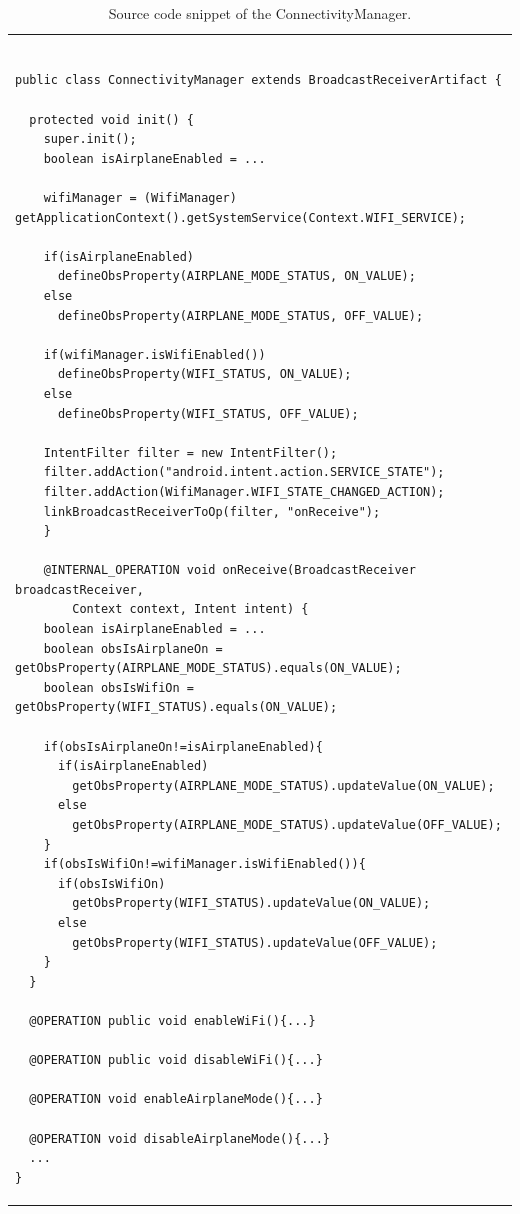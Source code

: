 \documentclass[11pt]{report}
\newcommand\labeltab[1]{\label{tb:#1}}
\begin{document}
\begin{table}[!htp]
\begin{tabular} {p{10cm}}
\begin{minipage}{10cm}
{\scriptsize \begin{verbatim}

public class ConnectivityManager extends BroadcastReceiverArtifact {
	
  protected void init() {
    super.init();
    boolean isAirplaneEnabled = ...

    wifiManager = (WifiManager) getApplicationContext().getSystemService(Context.WIFI_SERVICE);
		
    if(isAirplaneEnabled)
      defineObsProperty(AIRPLANE_MODE_STATUS, ON_VALUE);
    else
      defineObsProperty(AIRPLANE_MODE_STATUS, OFF_VALUE);
		
    if(wifiManager.isWifiEnabled())
      defineObsProperty(WIFI_STATUS, ON_VALUE);
    else
      defineObsProperty(WIFI_STATUS, OFF_VALUE);
		
    IntentFilter filter = new IntentFilter();
    filter.addAction("android.intent.action.SERVICE_STATE");
    filter.addAction(WifiManager.WIFI_STATE_CHANGED_ACTION);
    linkBroadcastReceiverToOp(filter, "onReceive");
	}
	
	@INTERNAL_OPERATION void onReceive(BroadcastReceiver broadcastReceiver, 
	    Context context, Intent intent) {
    boolean isAirplaneEnabled = ...
    boolean obsIsAirplaneOn = getObsProperty(AIRPLANE_MODE_STATUS).equals(ON_VALUE);
    boolean obsIsWifiOn = getObsProperty(WIFI_STATUS).equals(ON_VALUE);
		
    if(obsIsAirplaneOn!=isAirplaneEnabled){
      if(isAirplaneEnabled)
        getObsProperty(AIRPLANE_MODE_STATUS).updateValue(ON_VALUE);
      else
        getObsProperty(AIRPLANE_MODE_STATUS).updateValue(OFF_VALUE);
    }
    if(obsIsWifiOn!=wifiManager.isWifiEnabled()){
      if(obsIsWifiOn)
        getObsProperty(WIFI_STATUS).updateValue(ON_VALUE);
      else
        getObsProperty(WIFI_STATUS).updateValue(OFF_VALUE);
    }
  }
	
  @OPERATION public void enableWiFi(){...}

  @OPERATION public void disableWiFi(){...}

  @OPERATION void enableAirplaneMode(){...}
	
  @OPERATION void disableAirplaneMode(){...}
  ...
}
\end{verbatim}}
\end{minipage}
\end{tabular}
\caption{Source code snippet of the \textsf{ConnectivityManager}.}
    \labeltab{ConnectivityManager}
\end{table}
\end{document}
